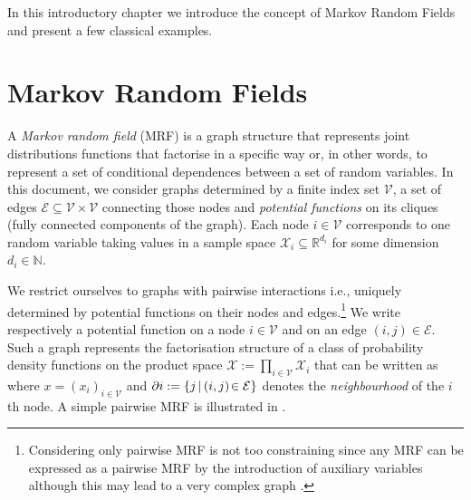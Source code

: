 In this introductory chapter we introduce the concept of Markov Random Fields and present a few classical examples.

\section{\label{subsection: mrf}Markov Random Fields}
A \emph{Markov random field} (MRF) is a graph structure that represents joint distributions functions that factorise in a specific way or, in other words, to represent a set of conditional dependences between a set of random variables. In this document, we consider graphs determined by a finite index set $\mathcal V$, a set of edges $\mathcal E\subseteq \mathcal V\times \mathcal V$ connecting those nodes and \emph{potential functions} on its cliques (fully connected components of the graph). Each node $i\in\mathcal V$ corresponds to one random variable taking values in a sample space $\mathcal X_i \subseteq\mathbb R^{d_i}$ for some dimension $d_i\in\mathbb N$. 

We restrict ourselves to graphs with pairwise interactions i.e., uniquely determined by potential functions on their nodes and edges.\footnote{Considering only pairwise MRF is not too constraining since any MRF can be expressed as a pairwise MRF by the introduction of auxiliary variables although this may lead to a very complex graph \citep{yedidia00, wainwright08}.}
We write
%
% 
respectively a potential function on a node $i\in \mathcal V$ and on an edge $(i,j)\in \mathcal E$. 
Such a graph represents the factorisation structure of a class of probability density functions on the product space $\mathcal X := \prod_{i\in \mathcal V}\mathcal X_{i}$ that can be written as
where $x=(x_{i})_{i\in \mathcal V}$ and $\partial i:=\{j\,|\, (i,j)\!\in\,\!\mathcal E\}$ denotes the \emph{neighbourhood} of the $i$th node. 
A simple pairwise MRF is illustrated in .\\

